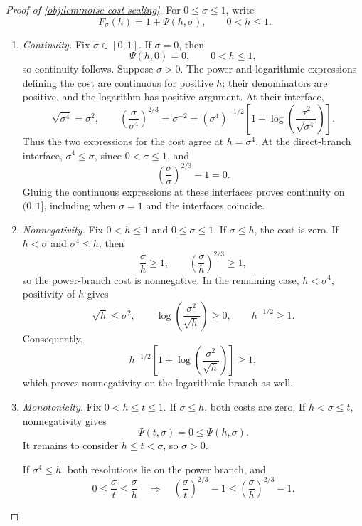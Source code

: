 \begin{proof}[Proof of \cref{obj:lem:noise-cost-scaling}]
For \(0\le \sigma\le1\), write
\[
F_\sigma(h)=1+\Psi(h,\sigma),\qquad 0<h\le1.
\]
\begin{enumerate}
\item \emph{Continuity.}
Fix \(\sigma\in[0,1]\). If \(\sigma=0\), then
\[
\Psi(h,0)=0,\qquad 0<h\le1,
\]
so continuity follows. Suppose \(\sigma>0\). The power and logarithmic expressions defining the cost are continuous for positive \(h\): their denominators are positive, and the logarithm has positive argument. At their interface,
\[
\sqrt{\sigma^4}=\sigma^2,\qquad
\left(\frac{\sigma}{\sigma^4}\right)^{2/3}
=\sigma^{-2}
=(\sigma^4)^{-1/2}
 \left[1+\log\left(\frac{\sigma^2}{\sqrt{\sigma^4}}\right)\right].
\]
Thus the two expressions for the cost agree at \(h=\sigma^4\).
At the direct-branch interface, \(\sigma^4\le\sigma\), since \(0<\sigma\le1\), and
\[
\left(\frac{\sigma}{\sigma}\right)^{2/3}-1=0.
\]
Gluing the continuous expressions at these interfaces proves continuity on \((0,1]\), including when \(\sigma=1\) and the interfaces coincide.

\item \emph{Nonnegativity.}
Fix \(0<h\le1\) and \(0\le\sigma\le1\). If \(\sigma\le h\), the cost is zero. If \(h<\sigma\) and \(\sigma^4\le h\), then
\[
\frac{\sigma}{h}\ge1,\qquad
\left(\frac{\sigma}{h}\right)^{2/3}\ge1,
\]
so the power-branch cost is nonnegative. In the remaining case, \(h<\sigma^4\), positivity of \(h\) gives
\[
\sqrt h\le\sigma^2,\qquad
\log\left(\frac{\sigma^2}{\sqrt h}\right)\ge0,
\qquad h^{-1/2}\ge1.
\]
Consequently,
\[
h^{-1/2}\left[1+\log\left(\frac{\sigma^2}{\sqrt h}\right)\right]\ge1,
\]
which proves nonnegativity on the logarithmic branch as well.

\item \emph{Monotonicity.}
Fix \(0<h\le t\le1\). If \(\sigma\le h\), both costs are zero. If \(h<\sigma\le t\), nonnegativity gives
\[
\Psi(t,\sigma)=0\le\Psi(h,\sigma).
\]
It remains to consider \(h\le t<\sigma\), so \(\sigma>0\).

If \(\sigma^4\le h\), both resolutions lie on the power branch, and
\[
0\le\frac{\sigma}{t}\le\frac{\sigma}{h}
\quad\Longrightarrow\quad
\left(\frac{\sigma}{t}\right)^{2/3}-1
\le
\left(\frac{\sigma}{h}\right)^{2/3}-1.
\]


\end{enumerate}
\end{proof}
